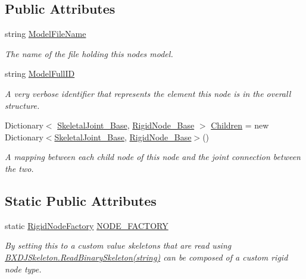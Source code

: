 \subsection*{Public Attributes}
\begin{DoxyCompactItemize}
\item 
string \hyperlink{class_rigid_node___base_aeb0303b14b3ec98d88a667fe7b61faf5}{Model\+File\+Name}
\begin{DoxyCompactList}\small\item\em The name of the file holding this node\textquotesingle{}s model. \end{DoxyCompactList}\item 
string \hyperlink{class_rigid_node___base_a90a113d4a7ce35fb515ec7348f48c574}{Model\+Full\+ID}
\begin{DoxyCompactList}\small\item\em A very verbose identifier that represents the element this node is in the overall structure. \end{DoxyCompactList}\item 
Dictionary$<$ \hyperlink{class_skeletal_joint___base}{Skeletal\+Joint\+\_\+\+Base}, \hyperlink{class_rigid_node___base}{Rigid\+Node\+\_\+\+Base} $>$ \hyperlink{class_rigid_node___base_a16a5bf5e9b0b985e723da889daa1128d}{Children} = new Dictionary$<$\hyperlink{class_skeletal_joint___base}{Skeletal\+Joint\+\_\+\+Base}, \hyperlink{class_rigid_node___base}{Rigid\+Node\+\_\+\+Base}$>$()
\begin{DoxyCompactList}\small\item\em A mapping between each child node of this node and the joint connection between the two. \end{DoxyCompactList}\end{DoxyCompactItemize}
\subsection*{Static Public Attributes}
\begin{DoxyCompactItemize}
\item 
static \hyperlink{class_rigid_node___base_ae13cbb7e730cd0e19c77efa84edbceca}{Rigid\+Node\+Factory} \hyperlink{class_rigid_node___base_a3852bedd7b03e4ca9023dbc82bfc911c}{N\+O\+D\+E\+\_\+\+F\+A\+C\+T\+O\+RY}
\begin{DoxyCompactList}\small\item\em By setting this to a custom value skeletons that are read using \hyperlink{class_b_x_d_j_skeleton_aeacead12f7e921a9c77a588773901798}{B\+X\+D\+J\+Skeleton.\+Read\+Binary\+Skeleton(string)} can be composed of a custom rigid node type. \end{DoxyCompactList}\end{DoxyCompactItemize}
